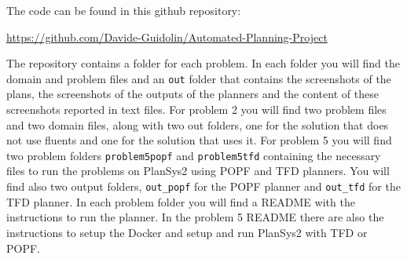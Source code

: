 The code can be found in this github repository:

\url{
    https://github.com/Davide-Guidolin/Automated-Planning-Project
    }

The repository contains a folder for each problem. In each folder
you will find the domain and problem files and an \verb+out+ folder
that contains the screenshots of the plans, the screenshots of
the outputs of the planners and the content of these screenshots 
reported in text files. For problem 2 you will find two problem 
files and two domain files, along with two out folders, one for the
solution that does not use fluents and one for the solution
that uses it. For problem 5 you will find two problem 
folders \verb+problem5popf+ and \verb+problem5tfd+ containing 
the necessary files to run the problems on PlanSys2 using POPF and TFD planners.
You will find also two output folders, \verb+out_popf+ for the POPF
planner and \verb+out_tfd+ for the TFD planner.
In each problem folder you will find a README with the instructions
to run the planner. In the problem 5 README there are also the instructions
to setup the Docker and setup and run PlanSys2 with TFD or POPF.